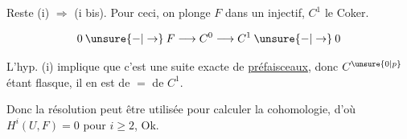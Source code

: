 
Reste  (i) $\Longrightarrow$ (i bis). Pour ceci, on plonge $F$ dans un injectif,  $C^1$ le Coker.

\[
0\mathbin{\unsure{-|\to}}F\longrightarrow C^0\longrightarrow C^1\mathbin{\unsure{-|\to}}0
\]

L'hyp. (i) implique que c'est une suite exacte de \uline{préfaisceaux}, donc $C^{\unsure{0|p}}$ étant flasque, il en est de $=$ de $C^1$.

Donc la résolution peut être utilisée pour calculer la cohomologie, d'où $H^i(U,F)=0$ pour $i\geq2$, Ok.

